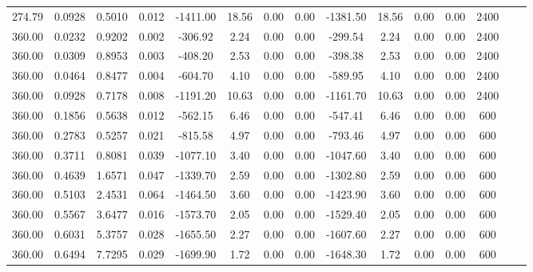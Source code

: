 \documentclass[%
 aip,
 jcp,
 sd,%
 amsmath,amssymb,
]{revtex4-1}
\begin{document}
\begin{table*}[!htbp]
\begin{ruledtabular}
\begin{tabular}{ccccccccccccccc}
274.79	&	0.0928	&	0.5010	&	0.012	&	-1411.00	&	18.56	&	0.00	&	0.00	&	-1381.50	&	18.56	&	0.00	&	0.00	&	2400	\\
360.00	&	0.0232	&	0.9202	&	0.002	&	-306.92	&	2.24	&	0.00	&	0.00	&	-299.54	&	2.24	&	0.00	&	0.00	&	2400	\\
360.00	&	0.0309	&	0.8953	&	0.003	&	-408.20	&	2.53	&	0.00	&	0.00	&	-398.38	&	2.53	&	0.00	&	0.00	&	2400	\\
360.00	&	0.0464	&	0.8477	&	0.004	&	-604.70	&	4.10	&	0.00	&	0.00	&	-589.95	&	4.10	&	0.00	&	0.00	&	2400	\\
360.00	&	0.0928	&	0.7178	&	0.008	&	-1191.20	&	10.63	&	0.00	&	0.00	&	-1161.70	&	10.63	&	0.00	&	0.00	&	2400	\\
360.00	&	0.1856	&	0.5638	&	0.012	&	-562.15	&	6.46	&	0.00	&	0.00	&	-547.41	&	6.46	&	0.00	&	0.00	&	600	\\
360.00	&	0.2783	&	0.5257	&	0.021	&	-815.58	&	4.97	&	0.00	&	0.00	&	-793.46	&	4.97	&	0.00	&	0.00	&	600	\\
360.00	&	0.3711	&	0.8081	&	0.039	&	-1077.10	&	3.40	&	0.00	&	0.00	&	-1047.60	&	3.40	&	0.00	&	0.00	&	600	\\
360.00	&	0.4639	&	1.6571	&	0.047	&	-1339.70	&	2.59	&	0.00	&	0.00	&	-1302.80	&	2.59	&	0.00	&	0.00	&	600	\\
360.00	&	0.5103	&	2.4531	&	0.064	&	-1464.50	&	3.60	&	0.00	&	0.00	&	-1423.90	&	3.60	&	0.00	&	0.00	&	600	\\
360.00	&	0.5567	&	3.6477	&	0.016	&	-1573.70	&	2.05	&	0.00	&	0.00	&	-1529.40	&	2.05	&	0.00	&	0.00	&	600	\\
360.00	&	0.6031	&	5.3757	&	0.028	&	-1655.50	&	2.27	&	0.00	&	0.00	&	-1607.60	&	2.27	&	0.00	&	0.00	&	600	\\
360.00	&	0.6494	&	7.7295	&	0.029	&	-1699.90	&	1.72	&	0.00	&	0.00	&	-1648.30	&	1.72	&	0.00	&	0.00	&	600	\\
\end{tabular}
\end{ruledtabular}
\end{table*}
\end{document}
